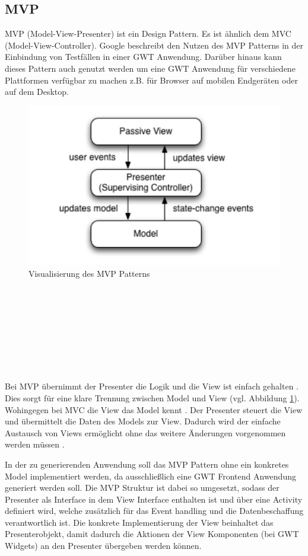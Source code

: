 \subsection{MVP}
\label{MVP}
MVP (Model-View-Presenter) ist ein Design Pattern. Es ist ähnlich dem MVC
(Model-View-Controller). Google beschreibt den Nutzen des MVP Patterns in der
Einbindung von Testfällen in einer GWT Anwendung. Darüber hinaus kann dieses
Pattern auch genutzt werden um eine GWT Anwendung für verschiedene Plattformen
verfügbar zu machen z.B. für Browser auf mobilen Endgeräten oder auf dem
Desktop.
\begin{figure}[htbp]
\begin{center}
\includegraphics{./img/MVP.pdf}
\caption{Visualisierung des MVP Patterns \cite{bib:MVP1}}\label{Fig:MVP}
\end{center}
\end{figure}\\\\\\\\\\\\\\\\
Bei MVP übernimmt der Presenter die Logik und die View ist einfach gehalten
\cite{bib:MVP2}. Dies sorgt für eine klare Trennung zwischen Model und View (vgl.
Abbildung \ref{Fig:MVP}). Wohingegen bei MVC die View das Model kennt
\cite{bib:MVCvsMVP}. Der Presenter steuert die View und übermittelt die Daten
des Models zur View.
Dadurch wird der einfache Austausch von Views ermöglicht ohne das weitere
Änderungen vorgenommen werden müssen \cite{bib:MVP1}\cite{bib:MVP2}.

In der zu generierenden Anwendung soll das MVP Pattern ohne ein konkretes Model
implementiert werden, da ausschließlich eine GWT Frontend Anwendung generiert
werden soll. Die MVP Struktur ist dabei so umgesetzt, sodass der Presenter als
Interface in dem View Interface enthalten ist und über eine Activity definiert
wird, welche zusätzlich für das Event handling und die Datenbeschaffung verantwortlich
ist. Die konkrete Implementierung der View beinhaltet das Presenterobjekt, damit
dadurch die Aktionen der View Komponenten (bei GWT Widgets) an den Presenter
übergeben werden können.
